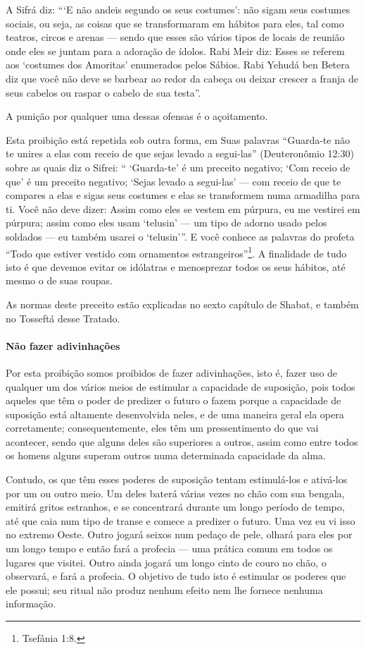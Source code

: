 A Sifrá diz: ```E não andeis segundo os seus costumes': não sigam seus
costumes sociais, ou seja, as coisas que se transformaram em hábitos
para eles, tal como teatros, circos e arenas --- sendo que esses são
vários tipos de locais de reunião onde eles se juntam para a adoração de
ídolos. Rabi Meir diz: Esses se referem aos `costumes dos Amoritas'
enumerados pelos Sábios. Rabi Yehudá ben Betera diz que você não deve se
barbear ao redor da cabeça ou deixar crescer a franja de seus cabelos ou
raspar o cabelo de sua testa''.

A punição por qualquer uma dessas ofensas é o açoitamento.

Esta proibição está repetida sob outra forma, em Suas palavras
``Guarda-te não te unires a elas com receio de que sejas levado a
segui-las'' (Deuteronômio 12:30) sobre as quais diz o Sifrei: ``
`Guarda-te' é um preceito negativo; `Com receio de que' é um preceito
negativo; `Sejas levado a segui-las' --- com receio de que te compares a
elas e sigas seus costumes e elas se transformem numa armadilha para ti.
Você não deve dizer: Assim como eles se vestem em púrpura, eu me
vestirei em púrpura; assim como eles usam `telusin' --- um tipo de
adorno usado pelos soldados --- eu também usarei o `telusin'''. E você
conhece as palavras do profeta ``Todo que estiver vestido com ornamentos
estrangeiros''\footnote{Tsefânia 1:8.}. A finalidade de tudo isto é que
devemos evitar os idólatras e menosprezar todos os seus hábitos, até
mesmo o de suas roupas.

As normas deste preceito estão explicadas no sexto capítulo de Shabat, e
também no Tosseftá desse Tratado.

\paragraph{Não fazer adivinhações}

Por esta proibição somos proibidos de fazer adivinhações, isto é, fazer
uso de qualquer um dos vários meios de estimular a capacidade de
suposição, pois todos aqueles que têm o poder de predizer o futuro o
fazem porque a capacidade de suposição está altamente desenvolvida
neles, e de uma maneira geral ela opera corretamente; consequentemente,
eles têm um pressentimento do que vai acontecer, sendo que alguns deles
são superiores a outros, assim como entre todos os homens alguns superam
outros numa determinada capacidade da alma.

Contudo, os que têm esses poderes de suposição tentam estimulá-los e
ativá-los por um ou outro meio. Um deles baterá várias vezes no chão com
sua bengala, emitirá gritos estranhos, e se concentrará durante um longo
período de tempo, até que caia num tipo de transe e comece a predizer o
futuro. Uma vez eu vi isso no extremo Oeste. Outro jogará seixos num
pedaço de pele, olhará para eles por um longo tempo e então fará a
profecia --- uma prática comum em todos os lugares que visitei. Outro
ainda jogará um longo cinto de couro no chão, o observará, e fará a
profecia. O objetivo de tudo isto é estimular os poderes que ele
possui; seu ritual não produz nenhum efeito nem lhe fornece nenhuma
informação.


